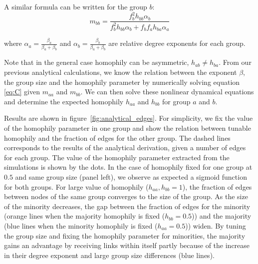 A similar formula can be written for the group $b$:
\begin{equation}
m_{bb} = \frac{f_{b}^2 h_{bb}\alpha_{b}}{f_{b}^2 h_{bb}\alpha_{b} + f_{b} f_{a} h_{ba}\alpha_{a}}
\end{equation}

where $\alpha_{a} = \frac{\beta_{a}}{\beta_{a} + \beta_{b}}$ and $\alpha_{b} = \frac{\beta_{b}}{\beta_{a} + \beta_{b}}$ are relative degree exponents for each group. 

Note that in the general case homophily can be asymmetric, $h_{ab} \neq h_{ba}$. From our previous analytical calculations, we know the relation between the exponent $\beta$, the group size and the homophily parameter by numerically solving equation \ref{eq:C} given $m_{aa}$ and $m_{bb}$. We can then solve these nonlinear dynamical equations and determine the expected homophily $h_{aa}$ and $h_{bb}$ for group $a$ and $b$. 

Results are shown in figure~\ref{fig:analytical_edges}. For simplicity, we fix the value of the homophily parameter in one group and show the relation between tunable homophily and the fraction of edges for the other group. The dashed lines corresponds to the results of the analytical derivation, given a number of edges for each group. The value of the homophily parameter extracted from the simulations is shown by the dots.
In the case of homophily fixed for one group at $0.5$ and same group size (panel left), we observe as expected a sigmoid function for both groups. For large value of homophily ($h_{aa}, h_{bb} = 1$), the fraction of edges between nodes of the same group converges to the size of the group. As the size of the minority decreases, the gap between the fraction of edges for the minority (orange lines when the majority homophily is fixed ($h_{bb} = 0.5$)) and the majority (blue lines when the minority homophily is fixed ($h_{aa} = 0.5$)) widen. By tuning the group size and fixing the homophily parameter for minorities, the majority gains an advantage by receiving links within itself partly because of the increase in their degree exponent and large group size differences (blue lines). 




